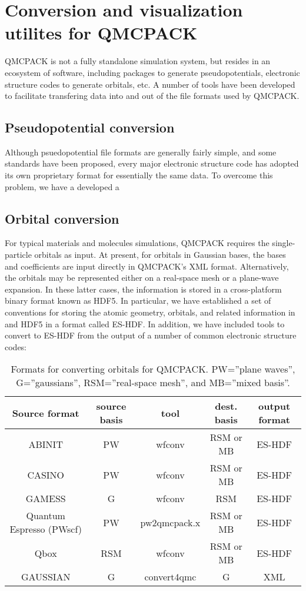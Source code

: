 \chapter{Conversion and visualization utilites for QMCPACK}\label{conversion}
QMCPACK is not a fully standalone simulation system, but resides in an
ecosystem of software, including packages to generate
pseudopotentials, electronic structure codes to generate orbitals,
etc.  A number of tools have been developed to facilitate transfering
data into and out of the file formats used by QMCPACK.

\section{Pseudopotential conversion}
Although psuedopotential file formats are generally fairly simple, and
some standards have been proposed, every major electronic structure
code has adopted its own proprietary format for essentially the same
data.  To overcome this problem, we have a developed a 

\section{Orbital conversion}
For typical materials and molecules simulations, QMCPACK requires
the single-particle orbitals as input.  At present, for orbitals in
Gaussian bases, the bases and coefficients are input directly in
QMCPACK's XML format.  Alternatively, the orbitals may be represented
either on a real-space mesh or a plane-wave expansion.  In these
latter cases, the information is stored in a cross-platform binary
format known as HDF5.  In particular, we have established a set of
conventions for storing the atomic geometry, orbitals, and related
information in and HDF5 in a format called ES-HDF.  In addition, we
have included tools to convert to ES-HDF from the output of a number
of common electronic structure codes:

\begin{table}[H]
\centering
\begin{tabular}{|c|c|c|c|c|}
\hline
Source format            & source basis & tool &
dest. basis & output format \\\hline
ABINIT                   & PW  & wfconv       & RSM or MB & ES-HDF \\
CASINO                   & PW  & wfconv       & RSM or MB & ES-HDF \\
GAMESS                   & G   & wfconv       & RSM       & ES-HDF \\
Quantum Espresso (PWscf) & PW  & pw2qmcpack.x & RSM or MB & ES-HDF \\
Qbox                     & RSM & wfconv       & RSM or MB & ES-HDF \\
GAUSSIAN                 & G   & convert4qmc  & G   & XML    \\
\hline
\end{tabular}
\caption{Formats for converting orbitals for QMCPACK.  PW=''plane
  waves'', G=''gaussians'', RSM=''real-space mesh'', and MB=''mixed basis''.}
\end{table}

